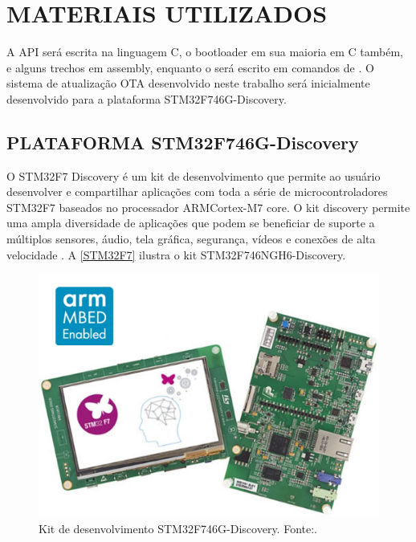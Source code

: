 \section{MATERIAIS UTILIZADOS}

A API será escrita na linguagem C, o bootloader em sua maioria em C também, e alguns trechos em assembly, enquanto o \linker será escrito em comandos de \linker. O sistema de atualização OTA desenvolvido neste trabalho será inicialmente desenvolvido para a plataforma STM32F746G-Discovery.

\subsection{PLATAFORMA STM32F746G-Discovery}

O STM32F7 Discovery é um kit de desenvolvimento que permite ao usuário desenvolver e compartilhar aplicações com toda a série de microcontroladores STM32F7 baseados no processador ARM\textregistered  Cortex\textregistered-M7 core.
O kit discovery permite uma ampla diversidade de aplicações que podem se beneficiar de suporte a múltiplos sensores, áudio, tela gráfica, segurança, vídeos e conexões de alta velocidade \cite{STM32F7}.
A \autoref{STM32F7} ilustra o kit STM32F746NGH6-Discovery.

\begin{figure}[H]
    \scriptsize
     \centering
     \includegraphics[scale=0.4]{dados/figuras/STM32F7.jpg}
     \caption{Kit de desenvolvimento STM32F746G-Discovery. \newline Fonte:\cite{STM32F7}.}
     \label{STM32F7}
\end{figure}

